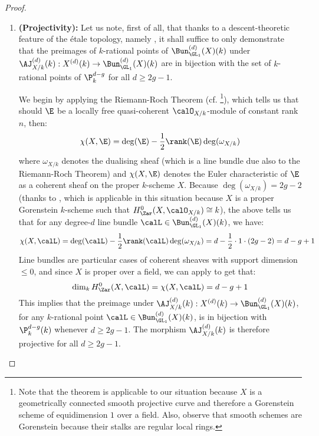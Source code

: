         \begin{proof}
                    \noindent
                    \begin{enumerate}
                        \item \textbf{(Projectivity):} Let us note, first of all, that thanks to a descent-theoretic feature of the \'etale topology, namely \cite[\href{https://stacks.math.columbia.edu/tag/024V}{Tag 024V}]{stacks}, it shall suffice to only demonstrate that the preimages of $k$-rational points of $\Bun_{\GL_1}^{(d)}(X)(k)$ under $\AJ_{X/k}^{(d)}(k): X^{(d)}(k) \to \Bun_{\GL_1}^{(d)}(X)(k)$ are in bijection with the set of $k$-rational points of $\P_k^{d - g}$ for all $d \geq 2g - 1$.
                        
                        We begin by applying the Riemann-Roch Theorem (cf. \cite[\href{https://stacks.math.columbia.edu/tag/0BS6}{Tag 0BS6}]{stacks}\footnote{Note that the theorem is applicable to our situation because $X$ is a geometrically connected smooth projective curve and therefore a Gorenstein scheme of equidimension $1$ over a field. Also, observe that smooth schemes are Gorenstein because their stalks are regular local rings.}), which tells us that should $\E$ be a locally free quasi-coherent $\calO_{X/k}$-module of constant rank $n$, then:
                            $$\chi(X, \E) = \deg(\E) - \frac12\rank(\E) \deg(\omega_{X/k})$$
                        where $\omega_{X/k}$ denotes the dualising sheaf (which is a line bundle due also to the Riemann-Roch Theorem) and $\chi(X, \E)$ denotes the Euler characteristic of $\E$ as a coherent sheaf on the proper $k$-scheme $X$. Because $\deg(\omega_{X/k}) = 2g - 2$ (thanks to \cite[\href{https://stacks.math.columbia.edu/tag/0C19}{Tag 0C19}]{stacks}, which is applicable in this situation because $X$ is a proper Gorenstein $k$-scheme such that $H^0_{\Zar}(X, \calO_{X/k}) \cong k$), the above tells us that for any degree-$d$ line bundle $\calL \in \Bun_{\GL_1}^{(d)}(X)(k)$, we have:
                            $$\chi(X, \calL) = \deg(\calL) - \frac12 \rank(\calL) \deg(\omega_{X/k}) = d - \frac12 \cdot 1 \cdot (2g - 2) = d - g + 1$$
                        Line bundles are particular cases of coherent sheaves with support dimension $\leq 0$, and since $X$ is proper over a field, we can apply \cite[\href{https://stacks.math.columbia.edu/tag/0AYT}{Tag 0AYT}]{stacks} to get that:
                            $$\dim_k H^0_{\Zar}(X, \calL) = \chi(X, \calL) = d - g + 1$$
                        This implies that the preimage under $\AJ_{X/k}^{(d)}(k): X^{(d)}(k) \to \Bun_{\GL_1}^{(d)}(X)(k)$, for any $k$-rational point $\calL \in \Bun_{\GL_1}^{(d)}(X)(k)$, is in bijection with $\P^{d - g}_k(k)$ whenever $d \geq 2g - 1$. The morphism $\AJ_{X/k}^{(d)}(k)$ is therefore projective for all $d \geq 2g - 1$.

\end{enumerate}
\end{proof}
